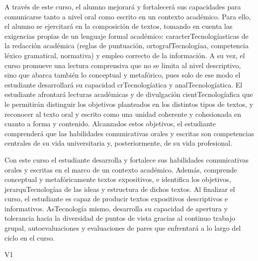 \begin{syllabus}


\begin{justification}
A través de este curso, el alumno mejorará y fortalecerá sus capacidades para comunicarse tanto a nivel oral como escrito en un contexto académico. Para ello, el alumno se ejercitará en la composición de textos, tomando en cuenta las exigencias propias de un lenguaje formal académico: caracterTecnologíasticas de la redacción académica (reglas de puntuación, ortografTecnologíaa, competencia léxico gramatical, normativa) y empleo correcto de la información. A su vez, el curso promueve una lectura comprensiva que no se limita al nivel descriptivo, sino que abarca también lo conceptual y metafórico, pues solo de ese modo el estudiante desarrollará su capacidad crTecnologíatica y analTecnologíatica. El estudiante afrontará lecturas académicas y de divulgación cientTecnologíafica que le permitirán distinguir los objetivos planteados en los distintos tipos de textos, y reconocer al texto oral y escrito como una unidad coherente y cohesionada en cuanto a forma y contenido. Alcanzados estos objetivos, el estudiante comprenderá que las habilidades comunicativas orales y escritas son competencias centrales de su vida universitaria y, posteriormente, de su vida profesional. 
\end{justification}

\begin{goals}
\item Con este curso el estudiante desarrolla y fortalece sus habilidades comunicativas orales y escritas en el marco de un contexto académico. Además, comprende conceptual y metafóricamente textos expositivos, e identifica los objetivos, jerarquTecnologíaa de las ideas y estructura de dichos textos. Al finalizar el curso, el estudiante es capaz de producir textos expositivos descriptivos e informativos. AsTecnología mismo, desarrolla su capacidad de apertura y tolerancia hacia la diversidad de puntos de vista gracias al continuo trabajo grupal, autoevaluaciones y evaluaciones de pares que enfrentará a lo largo del ciclo en el curso. 
\end{goals}

\begin{outcomes}{V1}
     \item {}
     \item {}
     \item {}
     \item {}
\end{outcomes}


\end{syllabus}
